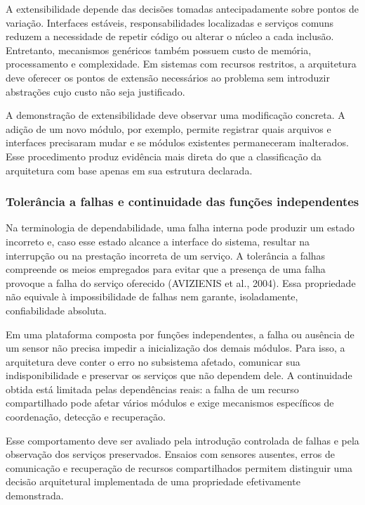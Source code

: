 \documentclass{article}
\begin{document}
A extensibilidade depende das decis\~oes tomadas antecipadamente sobre pontos de varia\c{c}\~ao. Interfaces est\'aveis, responsabilidades localizadas e servi\c{c}os comuns reduzem a necessidade de repetir c\'odigo ou alterar o n\'ucleo a cada inclus\~ao. Entretanto, mecanismos gen\'ericos tamb\'em possuem custo de mem\'oria, processamento e complexidade. Em sistemas com recursos restritos, a arquitetura deve oferecer os pontos de extens\~ao necess\'arios ao problema sem introduzir abstra\c{c}\~oes cujo custo n\~ao seja justificado.


A demonstra\c{c}\~ao de extensibilidade deve observar uma modifica\c{c}\~ao concreta. A adi\c{c}\~ao de um novo m\'odulo, por exemplo, permite registrar quais arquivos e interfaces precisaram mudar e se m\'odulos existentes permaneceram inalterados. Esse procedimento produz evid\^encia mais direta do que a classifica\c{c}\~ao da arquitetura com base apenas em sua estrutura declarada.


\subsubsection{Toler\^ancia a falhas e continuidade das fun\c{c}\~oes independentes}


Na terminologia de dependabilidade, uma falha interna pode produzir um estado incorreto e, caso esse estado alcance a interface do sistema, resultar na interrup\c{c}\~ao ou na presta\c{c}\~ao incorreta de um servi\c{c}o. A toler\^ancia a falhas compreende os meios empregados para evitar que a presen\c{c}a de uma falha provoque a falha do servi\c{c}o oferecido (AVIZIENIS et al., 2004). Essa propriedade n\~ao equivale \`a impossibilidade de falhas nem garante, isoladamente, confiabilidade absoluta.


Em uma plataforma composta por fun\c{c}\~oes independentes, a falha ou aus\^encia de um sensor n\~ao precisa impedir a inicializa\c{c}\~ao dos demais m\'odulos. Para isso, a arquitetura deve conter o erro no subsistema afetado, comunicar sua indisponibilidade e preservar os servi\c{c}os que n\~ao dependem dele. A continuidade obtida est\'a limitada pelas depend\^encias reais: a falha de um recurso compartilhado pode afetar v\'arios m\'odulos e exige mecanismos espec\'ificos de coordena\c{c}\~ao, detec\c{c}\~ao e recupera\c{c}\~ao.


Esse comportamento deve ser avaliado pela introdu\c{c}\~ao controlada de falhas e pela observa\c{c}\~ao dos servi\c{c}os preservados. Ensaios com sensores ausentes, erros de comunica\c{c}\~ao e recupera\c{c}\~ao de recursos compartilhados permitem distinguir uma decis\~ao arquitetural implementada de uma propriedade efetivamente demonstrada.
\end{document}
